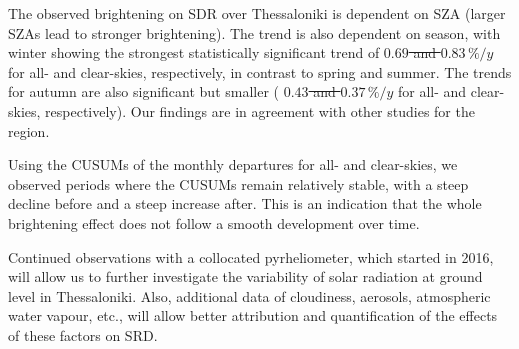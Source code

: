 \documentclass[applsci,article,submit,moreauthors,pdftex]{Definitions/mdpi}
\providecommand{\DIFadd}[1]{{\protect\color{blue}\uwave{#1}}} %
\providecommand{\DIFdel}[1]{{\protect\color{red}\sout{#1}}}                      %
\providecommand{\DIFaddbegin}{} %
\providecommand{\DIFaddend}{} %
\providecommand{\DIFdelbegin}{} %
\providecommand{\DIFdelend}{} %
\begin{document}
The observed brightening on SDR over Thessaloniki is dependent on SZA
(larger SZAs lead to stronger brightening). The trend is also dependent
on season, with winter showing the strongest statistically significant
trend of \DIFdelbegin \DIFdel{\(0.69\) and \(0.83\,\%/y\) }\DIFdelend \DIFaddbegin \DIFadd{\(0.7\) and \(0.4\,\%/y\) }\DIFaddend for all- and clear-skies,
respectively, in contrast to spring and summer. The trends for autumn
are also significant but smaller ( \DIFdelbegin \DIFdel{\(0.43\) and \(0.37\,\%/y\) }\DIFdelend \DIFaddbegin \DIFadd{\(0.42\) and \(0.054\,\%/y\) }\DIFaddend for all-
and clear-skies, respectively). Our findings are in agreement with other
studies for the region.

Using the CUSUMs of the monthly departures for all- and clear-skies, we
observed periods where the CUSUMs remain relatively stable, with a steep
decline before and a steep increase after. This is an indication that
the whole brightening effect does not follow a smooth development over
time.

Continued observations with a collocated pyrheliometer, which started in
2016, will allow us to further investigate the variability of solar
radiation at ground level in Thessaloniki. Also, additional data of
cloudiness, aerosols, atmospheric water vapour, etc., will allow better
attribution and quantification of the effects of these factors on SRD.


\vspace{6pt}







\end{document}

